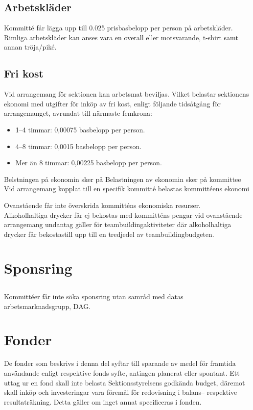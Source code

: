 \documentclass[a4paper, 10pt]{article}
\begin{document}
\subsection{Arbetskläder}

Kommitté får lägga upp till 0.025 prisbasbelopp per person på arbetskläder. Rimliga arbetskläder kan anses vara en overall eller motsvarande, t-shirt samt annan
tröja/piké.

\subsection{Fri kost}
Vid arrangemang för sektionen kan arbetsmat beviljas. Vilket belastar sektionens ekonomi med utgifter för inköp av fri kost, enligt följande tidsåtgång för arrangemanget, avrundat till närmaste femkrona:
\begin{itemize}
    \item 1–4 timmar: 0,00075 basbelopp per person.
    \item 4–8 timmar: 0,0015 basbelopp per person.
    \item Mer än 8 timmar: 0,00225 basbelopp per person.
\end{itemize}

Belstningen på ekonomin sker på 
Belastningen av ekonomin sker på kommittee Vid arrangemang kopplat till en specifik kommitté belastas kommittéens ekonomi

Ovanstående får inte överskrida kommitténs ekonomiska resurser. \\
Alkoholhaltiga drycker får ej bekostas med kommitténs pengar vid ovanstående arrangemang undantag gäller för teambuildingaktiviteter där alkoholhaltiga drycker får bekostastill upp till en tredjedel av teambuildingbudgeten.


\section{Sponsring}
\subsection{}
Kommittéer får inte söka sponsring utan samråd med datas
arbetsmarknadsgrupp, DAG.

\section{Fonder}
De fonder som beskrivs i denna del syftar till sparande av medel för framtida användande enligt respektive fonds syfte, antingen planerat eller spontant. Ett uttag ur en fond skall inte belasta Sektionsstyrelsens godkända budget, däremot skall inköp och investeringar vara föremål för redovisning i balans– respektive resultaträkning. Detta gäller om inget annat specificeras i fonden.
\end{document}
